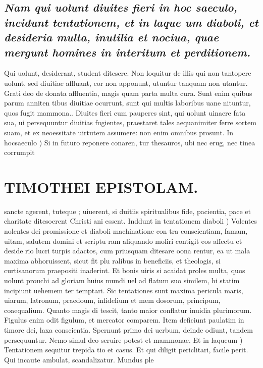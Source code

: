 \documentclass{article}
\begin{document}
\begin{pages}
\subsection*{\textit{Nam qui uolunt diuites fieri in hoc saeculo, incidunt tentationem, et in laque um diaboli, et desideria multa, inutilia et nociua, quae mergunt homines in interitum et perditionem. }}\pstart Qui uolunt, desiderant, student ditescre. Non loquitur de illis qui non tantopere uolunt, sed diuitiae affluant, cor non apponunt, utuntur tanquam non utantur. Grati deo de donata affluentia, magis quam parta multa cura. Sunt enim quibus parum anniten tibus diuitiae ocurrunt, sunt qui multis laboribus uane nituntur, quos fugit mammona.. Diuites fieri cum pauperes sint, qui uolunt uinaere fata sua, ui persequuntur diuitias fugientes, praestaret tales aequanimiter ferre sortem suam, et ex neoessitate uirtutem assumere: non enim omnibus prosunt.  \pend\pstart In hocsaeculo ) Si in futuro reponere conaren, tur thesauros, ubi nec erug, nec tinea corrumpit  \pend
\section*{TIMOTHEI EPISTOLAM. }
\marginpar{[ p.165 ]}\pstart sancte agerent, tuteque ; uiuerent, si duitiis spiritualibus fide, pacientia, pace et charitate ditesoerent Christi ani essent.  \pend\pstart Inddunt in tentationem diaboli ) Volentes nolentes dei promissione et diaboli machinatione con tra conscientiam, famam, uitam, salutem domini et scriptu ram aliquando moliri contigit eos affectu et deside rio lucri turpis adactos, cum priusquam ditesare oona rentur, ea ut mala maxima abhoruissent, sicut fit plu ralibus in beneficiis, et theologis, si curtisanorum praepositi inaderint. Et bonis uiris si acaidat proles multa, quos uolunt prouchi ad gloriam huius mundi uel ad flatum suo similem, hi statim incipiunt uehemem ter temptari. Sic tentationes sunt maxima pericula maris, uiarum, latronum, praedoum, infidelium et mem dosorum, principum, coaequalium. Quanto magis di tescit, tanto maior conflatur inuidia plurimorum. Figulus enim odit figulum, et mercator comparem. Item deficiunt paulatim in timore dei, laxa conscientia. Spernunt primo dei uerbum, deinde odiunt, tandem persequuntur. Nemo simul deo seruire potest et mammonae.  \pend\pstart Et in laqueum ) Tentationem sequitur trepida tio et casus. Et qui diligit periclitari, facile perit. Qui incaute ambulat, scandalizatur. Mundus ple  \pend

\end{pages}
\end{document}

